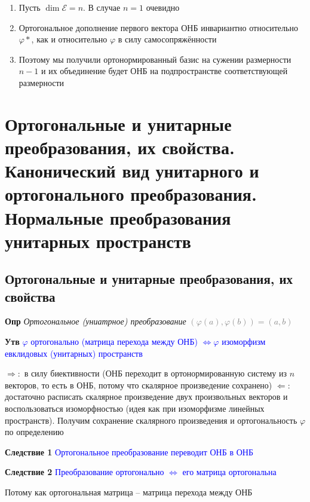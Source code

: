 \documentclass[a4paper, 14pt]{article}
\begin{document}
    \begin{enumerate}
        \item Пусть $\dim \mathscr{E} = n$.
        В случае $n = 1$ очевидно
        \item Ортогональное дополнение первого вектора ОНБ инвариантно относительно $\varphi*$, как и относительно $\varphi$ в
        силу самосопряжённости
        \item Поэтому мы получили ортонормированный базис на сужении размерности $n - 1$ и их объединение будет ОНБ на
        подпространстве соответствующей размерности
    \end{enumerate}
    
    \section{Ортогональные и унитарные преобразования, их свойства.
    Канонический вид унитарного и ортогонального преобразования.
    Нормальные преобразования унитарных пространств}
    
    \subsection{Ортогональные и унитарные преобразования, их свойства}
    
    \textbf{Опр} \textit{Ортогональное (униатрное) преобразование} \textcolor{gray}{$(\varphi (a), \varphi (b)) = (a, b)$}
    
    \textbf{Утв} \textcolor{blue}{$\varphi$ ортогонально (матрица перехода между ОНБ) $\Leftrightarrow \varphi$
        изоморфизм евклидовых (унитарных) пространств}
    
    $\Rightarrow:$ в силу биективности (ОНБ переходит в ортонормированную систему из $n$ векторов, то есть в ОНБ,
    потому что скалярное произведение сохранено)
    $\Leftarrow:$ достаточно расписать скалярное произведение двух произвольных векторов и воспользоваться
    изоморфностью (идея как при изоморфизме линейных пространств).
    Получим сохранение скалярного произведения и ортогональность $\varphi$ по определению
    
    \textbf{Следствие 1} \textcolor{blue}{Ортогональное преобразование переводит ОНБ в ОНБ}
    
    \textbf{Следствие 2} \textcolor{blue}{Преобразование ортогонально $\Leftrightarrow$ его матрица ортогональна}
    
    Потому как ортогональная матрица -- матрица перехода между ОНБ
    
\end{document}
